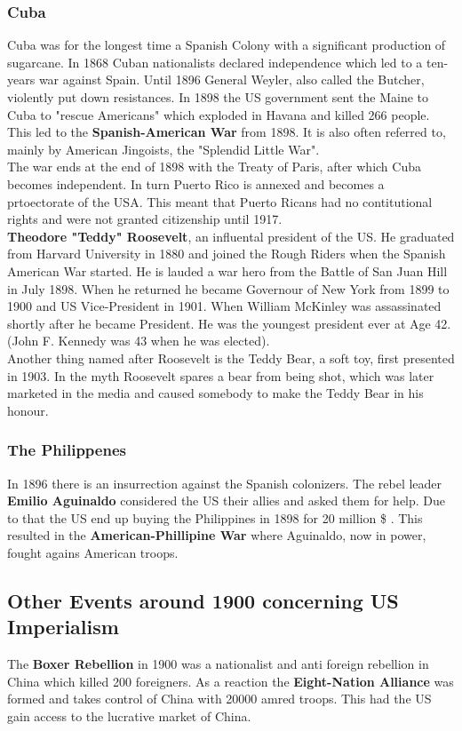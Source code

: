 \documentclass{article}
\begin{document}
	\subsubsection{Cuba}
	Cuba was for the longest time a Spanish Colony with a significant production of sugarcane. In 1868 Cuban nationalists declared independence which led to a ten-years war against Spain. Until 1896 General Weyler, also called the Butcher, violently put down resistances. In 1898 the US government sent the Maine to Cuba to "rescue Americans" which exploded in Havana and killed 266 people. \\
	This led to the \textbf{Spanish-American War} from 1898. It is also often referred to, mainly by American Jingoists, the "Splendid Little War". \\
	The war ends at the end of 1898 with the Treaty of Paris, after which Cuba becomes independent. In turn Puerto Rico is annexed and becomes a prtoectorate of the USA. This meant that Puerto Ricans had no contitutional rights and were not granted citizenship until 1917. \\
	\textbf{Theodore "Teddy" Roosevelt}, an influental president of the US. He graduated from Harvard University in 1880 and joined the Rough Riders when the Spanish American War started. He is lauded a war hero from the Battle of San Juan Hill in July 1898. When he returned he became Governour of New York from 1899 to 1900 and US Vice-President in 1901. When William McKinley was assassinated shortly after he became President. He was the youngest president ever at Age 42. (John F. Kennedy was 43 when he was elected). \\
	Another thing named after Roosevelt is the Teddy Bear, a soft toy, first presented in 1903. In the myth Roosevelt spares a bear from being shot, which was later marketed in the media and caused somebody to make the Teddy Bear in his honour. \\
	\subsubsection{The Philippenes}
	In 1896 there is an insurrection against the Spanish colonizers. The rebel leader \textbf{Emilio Aguinaldo} considered the US their allies and asked them for help. Due to that the US end up buying the Philippines in 1898 for 20 million \$ . This resulted in the \textbf{American-Phillipine War} where Aguinaldo, now in power, fought agains American troops. \\
	\subsection{Other Events around 1900 concerning US Imperialism}
	The \textbf{Boxer Rebellion} in 1900 was a nationalist and anti foreign rebellion in China which killed 200 foreigners. As a reaction the \textbf{Eight-Nation Alliance} was formed and takes control of China with 20000 amred troops. This had the US gain access to the lucrative market of China. \\
\end{document}

